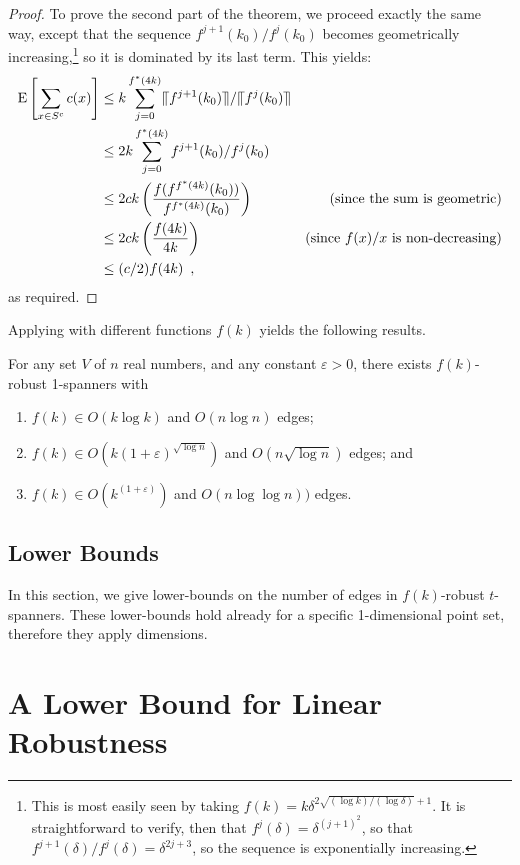 \documentclass{patmorin}
\newcommand{\eps}{\varepsilon}
\begin{document}
\begin{proof}
  To prove the second part of the theorem, we proceed exactly the
  same way, except that the sequence $f^{j+1}(k_0)/f^j(k_0)$ becomes
  geometrically increasing,\footnote{This is most easily seen by
  taking $f(k) = k\delta^{2\sqrt{(\log k)/(\log\delta)}+1}$.  It is
  straightforward to verify, then that $f^j(\delta) = \delta^{(j+1)^2}$,
  so that $f^{j+1}(\delta)/f^j(\delta)= \delta^{2j+3}$, so the sequence
  is exponentially increasing.} so it is dominated by its last term.
  This yields:
  \begin{align*}
  \mathrm{E}\left[\sum_{x\in S^c} c(x)\right] 
      & \le  k \sum_{j=0}^{f^*(4k)} \llceil f^{j+1}(k_0)\rrceil/\llceil f^j(k_0)\rrceil \\
      & \le  2k \sum_{j=0}^{f^*(4k)} f^{j+1}(k_0)/f^j(k_0) \\
      & \le  2ck\left(\frac{f(f^{f^*(4k)}(k_0))}{f^{f^*(4k)}(k_0)}\right) 
            & \text{(since the sum is geometric)} \\
      & \le  2ck\left(\frac{f(4k)}{4k}\right) 
            & \text{(since $f(x)/x$ is non-decreasing)} \\
      & \le  (c/2)f(4k) \enspace ,
  \end{align*}
  as required.
\end{proof}


Applying  with different functions $f(k)$ yields the
following results.
\begin{cor}
  For any set $V$ of $n$ real numbers, and any constant $\eps >0$,
  there exists $f(k)$-robust 1-spanners with
  \begin{enumerate}
    \item $f(k)\in O(k\log k)$ and $O(n\log n)$ edges;
    \item $f(k)\in O(k(1+\eps)^{\sqrt{\log n}})$ and $O(n\sqrt{\log n})$
      edges; and
    \item $f(k)\in O(k^{(1+\eps)})$ and $O(n\log\log n))$ edges.
  \end{enumerate}
\end{cor}


\subsection{Lower Bounds}

In this section, we give lower-bounds on the number of edges in
$f(k)$-robust $t$-spanners.  These lower-bounds hold already for a
specific 1-dimensional point set, therefore they apply dimensions.

\section{A Lower Bound for Linear Robustness}
\end{document}
